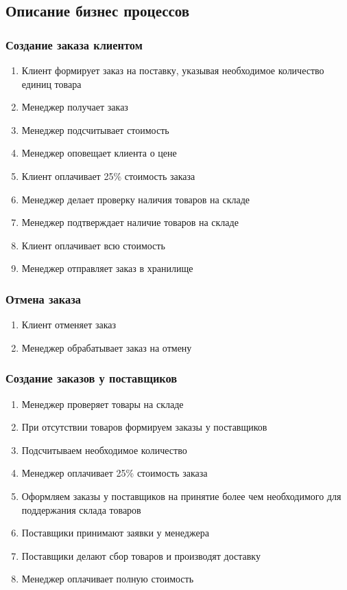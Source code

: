 \subsection{Описание бизнес процессов}
	\subsubsection{Создание заказа клиентом}
	\begin{enumerate}
		\item Клиент формирует заказ на поставку, указывая необходимое количество единиц товара
		\item Менеджер получает заказ
		\item Менеджер подсчитывает стоимость
		\item Менеджер оповещает клиента о цене
		\item Клиент оплачивает 25\% стоимость заказа
		\item Менеджер делает проверку наличия товаров на складе
		\item Менеджер подтверждает наличие товаров на складе
		\item Клиент оплачивает всю стоимость
		\item Менеджер отправляет заказ в хранилище
	\end{enumerate}
	
	\subsubsection{Отмена заказа}
	\begin{enumerate}
		\item Клиент отменяет заказ
		\item Менеджер обрабатывает заказ на отмену
	\end{enumerate}
	
	\subsubsection{Создание заказов у поставщиков}
	\begin{enumerate}
		\item Менеджер проверяет товары на складе
		\item При отсутствии товаров формируем заказы у поставщиков
		\item Подсчитываем необходимое количество
		\item Менеджер оплачивает 25\% стоимость заказа
		\item Оформляем заказы у поставщиков на принятие более чем необходимого для поддержания склада товаров
		\item Поставщики принимают заявки у менеджера
		\item Поставщики делают сбор товаров и производят доставку
		\item Менеджер оплачивает полную стоимость
	\end{enumerate}